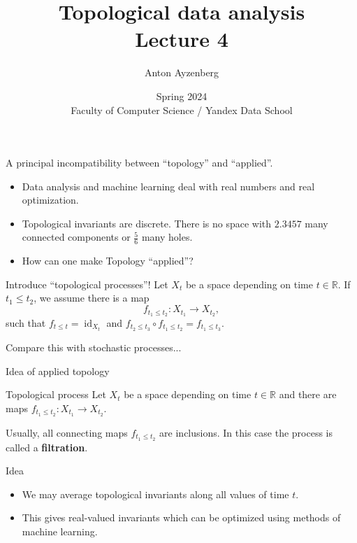 \documentclass[10pt,xcolor={usenames}]{beamer}
\title[Topology intro]{Topological data analysis \\ Lecture 4}
\author[Anton Ayzenberg]{ Anton Ayzenberg }%
\date[FCS-YDS'24]{Spring 2024 \\ Faculty of Computer Science / Yandex Data School}
\institute[ATA \& Noeon Research]{ATA Lab, FCS NRU HSE \\ Noeon Research}
\DeclareMathOperator{\id}{id}
\newcommand{\Ro}{\mathbb{R}}
\begin{document}
\maketitle


\begin{frame}{A principal incompatibility between ``topology'' and ``applied''.}

\begin{itemize}
  \item Data analysis and machine learning deal with real numbers and real optimization.
  \item Topological invariants are discrete. There is no space with $2.3457$ many connected components or $\frac{5}{6}$ many holes.
  \item How can one make Topology ``applied''?
\end{itemize}
\pause

\begin{block}{Introduce ``topological processes''!}
Let $X_t$ be a space depending on time $t\in\Ro$. If $t_1\leq t_2$, we assume there is a map
\[
f_{t_1\leqslant t_2}\colon X_{t_1}\to X_{t_2},
\]
such that $f_{t\leqslant t}=\id_{X_t}$ and $f_{t_2\leqslant t_3}\circ f_{t_1\leqslant t_2}=f_{t_1\leqslant t_3}$.
\end{block}

Compare this with stochastic processes...

\end{frame}


\begin{frame}{Idea of applied topology}

\begin{block}{Topological process}
Let $X_t$ be a space depending on time $t\in\Ro$ and there are maps $f_{t_1\leqslant t_2}\colon X_{t_1}\to X_{t_2}$.
\end{block}

Usually, all connecting maps $f_{t_1\leqslant t_2}$ are inclusions. In this case the process is called a \textbf{filtration}.

\begin{block}{Idea}
\begin{itemize}
  \item We may average topological invariants along all values of time $t$.
  \item This gives real-valued invariants which can be optimized using methods of machine learning.
\end{itemize}
\end{block}

\end{frame}
\end{document}
